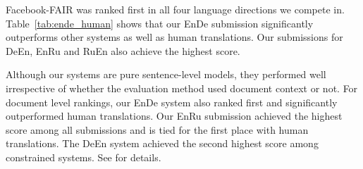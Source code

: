 \documentclass[11pt,a4paper]{article}
\newcommand{\entode}{EnDe}
\newcommand{\detoen}{DeEn}
\newcommand{\entoru}{EnRu}
\newcommand{\rutoen}{RuEn}
\begin{document}
Facebook-FAIR was ranked first in all four language directions we compete in. 
Table~\ref{tab:ende_human} shows that our \entode{} submission significantly outperforms other systems as well as human translations. 
Our submissions for \detoen{}, \entoru{} and \rutoen{} also achieve the highest score. 

Although our systems are pure sentence-level models, they performed well irrespective of whether the evaluation method used document context or not. 
For document level rankings, our \entode{} system also ranked first and significantly outperformed human translations. 
Our \entoru{} submission achieved the highest score among all submissions and is tied for the first place with human translations. 
The \detoen{} system achieved the second highest score among constrained systems. See \citep{bojar-wmt19} for details.
\end{document}

